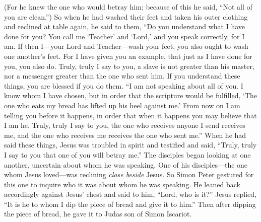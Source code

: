 \begin{biblechapter}
\verse (For he knew the one who would betray him; because of this he said, “Not all of you are clean.”)
\verse So when he had washed their feet and taken his outer clothing and reclined at table again, he said to them, “Do you understand what I have done for you?
\verse You call me ‘Teacher’ and ‘Lord,’ and you speak correctly, for I am.
\verse If then I—your Lord and Teacher—wash your feet, you also ought to wash one another’s feet.
\verse For I have given you an example, that just as I have done for you, you also do.
\verse Truly, truly I say to you, a slave is not greater than his master, nor a messenger greater than the one who sent him.
\verse If you understand these things, you are blessed if you do them.
\verse “I am not speaking about all of you. I know whom I have chosen, but in order that the scripture would be fulfilled, ‘The one who eats my bread has lifted up his heel against me.’
\verse From now on I am telling you before it happens, in order that when it happens you may believe that I am he.
\verse Truly, truly I say to you, the one who receives anyone I send receives me, and the one who receives me receives the one who sent me.”
 When he had said these things, Jesus was troubled in spirit and testified and said, “Truly, truly I say to you that one of you will betray me.”
\verse The disciples began looking at one another, uncertain about whom he was speaking.
\verse One of his disciples—the one whom Jesus loved—was reclining \textit{close beside} Jesus.
\verse So Simon Peter gestured for this one to inquire who it was about whom he was speaking.
\verse He leaned back accordingly against Jesus’ chest and said to him, “Lord, who is it?”
\verse Jesus replied, “It is he to whom I dip the piece of bread and give it to him.” Then after dipping the piece of bread, he gave it﻿ to Judas son of Simon Iscariot.

\end{biblechapter}
